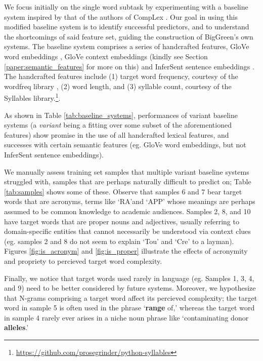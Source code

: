 \documentclass{dcthesis}
\theoremstyle{definition}
\theoremstyle{remark}
\begin{document}
We focus initially on the single word subtask by experimenting with a baseline system inspired by that of the authors of CompLex \citep{shardlow2020complex}. Our goal in using this modified baseline system is to identify successful predictors, and to understand the shortcomings of said feature set, guiding the construction of BigGreen's own systems. The baseline system comprises a series of handcrafted features, GloVe word embeddings \citep{pennington2014glove}, GloVe context embeddings (kindly see Section \ref{paper:semantic_features} for more on this) and InferSent sentence embeddings \citep{conneau-EtAl:2017:EMNLP2017}. The handcrafted features include (1) target word frequency, courtesy of the wordfreq library \citep{robyn_speer_2018_1443582}, (2) word length, and (3) syllable count, courtesy of the Syllables library.\footnote{\url{https://github.com/prosegrinder/python-syllables}}. 

As shown in Table \ref{tab:baseline_systems}, performances of variant baseline systems (a \textit{variant} being a fitting over some subset of the aforementioned features) show promise in the use of all handcrafted lexical features, and successes with certain semantic features (eg. GloVe word embeddings, but not InferSent sentence embeddings). 

We manually assess training set samples that multiple variant baseline systems struggled with, samples that are perhaps naturally difficult to predict on; Table \ref{tab:samples} shows some of these. Observe that samples 6 and 7 bear target words that are acronyms, terms like \lq{RA}\rq and \lq{APP}\rq{} whose meanings are perhaps assumed to be common knowledge to academic audiences. Samples 2, 8, and 10 have target words that are proper nouns and adjectives, usually referring to domain-specific entities that cannot necessarily be understood via context clues (eg. samples 2 and 8 do not seem to explain \lq{Tou}\rq{} and \lq{Cre}\rq{} to a layman). Figures \ref{fig:is_acronym} and \ref{fig:is_proper} illustrate the effects of acronymity and propriety to percieved target word complexity.

Finally, we notice that target words used rarely in language (eg. Samples 1, 3, 4, and 9) need to be better considered by future systems. Moreover, we hypothesize that N-grams comprising a target word affect its percieved complexity; the target word in sample 5 is often used in the phrase \lq{\textbf{range} of,}\rq{} whereas the target word in sample 4 rarely ever arises in a niche noun phrase like \lq{contaminating donor \textbf{alleles}.}\rq{} 
\end{document}

